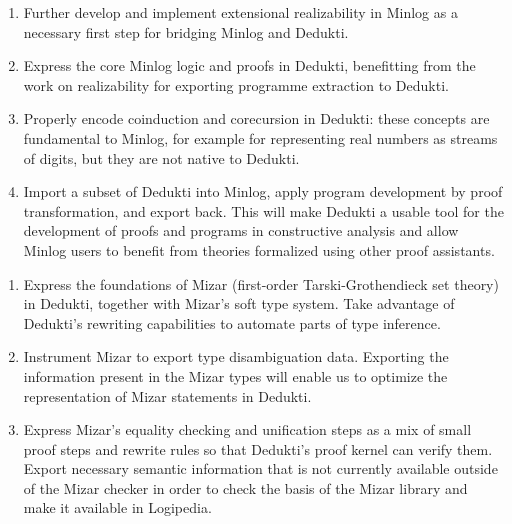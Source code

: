 \begin{workpackage}
\begin{tasklist}
\begin{task}[id=minlog,
  title=Express the theory of Minlog in Dedukti,
  shorttitle=Express the theory of Minlog in Dedukti,
  lead=Lmu,
  LmuRM=16, %
  wphases=1-48,
  ]
  \begin{enumerate}
  \item Further develop and implement extensional realizability in Minlog as
    a necessary first step for bridging Minlog and Dedukti.
  \item Express the core Minlog logic and proofs in Dedukti, benefitting from
    the work on realizability for exporting programme extraction to Dedukti.
  \item Properly encode coinduction and corecursion in Dedukti: these concepts are
    fundamental to Minlog, for example for representing real numbers as streams of
    digits, but they are not native to Dedukti.
  \item Import a subset of Dedukti into Minlog, apply program development by proof
    transformation, and export back. This will make Dedukti a usable tool for the
    development of proofs and programs in constructive analysis and allow Minlog
    users to benefit from theories formalized using other proof assistants.
  \end{enumerate}
\end{task}

\begin{task}[id=mizar,
  title=Express the theory of Mizar in Dedukti,
  shorttitle=Express the theory of Mizar in Dedukti,
  lead=Bia,   %
  BiaRM=70, %
  InnRM=12,   %
  wphases=1-48,
  ]
  \begin{enumerate}
  \item Express the foundations of Mizar (first-order Tarski-Grothendieck set
    theory) in Dedukti, together with Mizar's soft
    type system. Take advantage of Dedukti's rewriting capabilities to automate
    parts of type inference.
  \item Instrument Mizar to export type disambiguation data. Exporting the
    information present in the Mizar types will enable us to optimize the
    representation of Mizar statements in Dedukti.
  \item Express Mizar's equality checking and unification steps as a mix of
    small proof steps and rewrite rules so that Dedukti's proof kernel can
    verify them. Export necessary semantic information that is not currently
    available outside of the Mizar checker in order to check the basis of the
    Mizar library and make it available in Logipedia.
  \end{enumerate}
\end{task}


\end{tasklist}
\end{workpackage}
